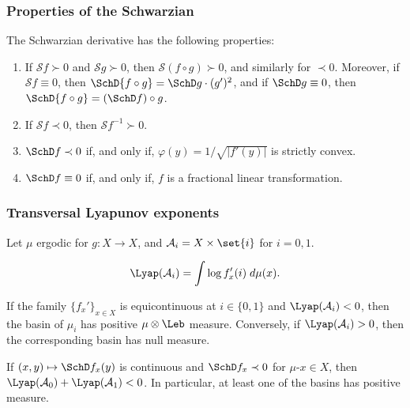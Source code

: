 \documentclass[shortlabels, 9pt, aspectratio=2013]{beamer}
\begin{document}
\begin{frame}
  \frametitle{Properties of the Schwarzian}
  \begin{proposition}\label{prop:schwarzian}
    The Schwarzian derivative has the following properties:
    \begin{enumerate}
    \item\label{prop:schwarzian:item:1}
      If \(\mathcal{S}f \succ 0\) and \(\mathcal{S}g \succ 0\), then \(\mathcal{S}(f \circ g) \succ 0\), and similarly for \(\prec 0\). Moreover, if \(\mathcal{S}f \equiv 0\), then \(\SchD{f \circ g} = \SchD g \cdot (g')^2\), and if \(\SchD g \equiv 0\), then \(\SchD{f \circ g} = (\SchD f) \circ g\).
    \item If \(\mathcal{S}f \prec 0\), then \(\mathcal{S}f^{-1} \succ 0\). 
    \item\label{prop:schwarzian:item:3} \(\SchD f \prec 0\) if, and only if, \(\varphi(y) = 1/ \sqrt{\lvert f'(y) \rvert}\) is strictly convex.
    \item \(\SchD f \equiv 0\) if, and only if, \(f\) is a fractional linear transformation.
    \end{enumerate}
  \end{proposition}
\end{frame}

\begin{frame}
  \frametitle{Transversal Lyapunov exponents}
  Let \(\mu\) ergodic for \(g \colon X \to X\), and \(\mathcal{A}_i = X \times \set{i}\) for \(i = 0,1\).
  \begin{definition}
    \begin{equation*}
      \Lyap(\mathcal{A}_i) = \int \log f_{x}'(i) \;d \mu(x).
    \end{equation*}
  \end{definition}
  \begin{lemma}\label{lem:lyap-basin-posmeas}
    If the family \(\{ f_x' \}_{x \in X}\) is equicontinuous at \(i \in \{ 0,1 \}\) and \(\Lyap(\mathcal{A}_i) < 0\), then the basin of \(\mu_i\) has positive \(\mu \otimes \Leb\) measure.  Conversely, if \(\Lyap(\mathcal{A}_i) > 0\), then the corresponding basin has null measure.
  \end{lemma}
  \begin{corollary}\label{cor:schwarz-basin-pos-meas}
    If \((x,y) \mapsto \SchD f_x(y)\) is continuous and \(\SchD f_x \prec 0\) for \(\mu\)-\almostevery \(x \in X\), then \(\Lyap(\mathcal{A}_0) + \Lyap(\mathcal{A}_1) < 0\).
    In particular, at least one of the basins has positive measure.
  \end{corollary}
  
\end{frame}
\end{document}

